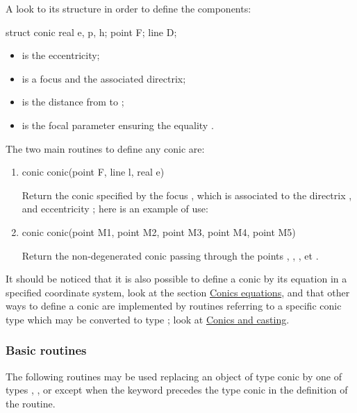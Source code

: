 \documentclass[pdftex]{article}
\begin{document}
A look to its structure in order to define the
components:
\begin{center}
  \begin{Vcolor}
    struct conic { real e, p, h; point F; line D; }
  \end{Vcolor}
\end{center}
\begin{itemize}
\item {} is the eccentricity;
\item {} is a focus and  the associated directrix;
\item {} is the distance from  to ;
\item {} is the focal parameter ensuring the equality .
\end{itemize}

The two main routines to define any conic are:

\begin{enumerate}
\item {}
  \begin{Vcolor}
    conic conic(point F, line l, real e)
  \end{Vcolor}
  Return the conic specified by the focus , which is associated to the
  directrix , and eccentricity ; here is an example of use:
\item {}
  \begin{Vcolor}
    conic conic(point M1, point M2, point M3, point M4, point M5)
  \end{Vcolor}
  Return the non-degenerated conic passing through the
  points  , , , 
  et .
\end{enumerate}
It should be noticed that it is also possible to define a conic
by its equation in a specified coordinate system, look at the section
\href{#subsection.bqe}{Conics equations}, and that other ways to
define a conic are implemented by routines referring to a specific
conic type which may be converted to type ; look at
\href{#subsubsection.castingconic}{Conics and casting}.

\subsubsection{Basic routines}
The following routines may be used replacing an object of type conic
by one of types , ,
 or  except when the keyword
 precedes the type conic in the definition of the
routine.
\end{document}
